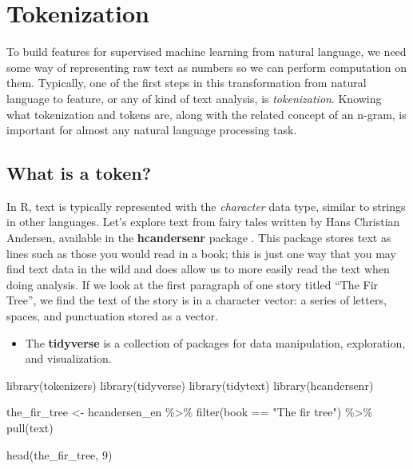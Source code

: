 \documentclass[
]{krantz}
\makeatletter
\newenvironment{Shaded}{\begin{snugshade}}{\end{snugshade}}
\newcommand{\DecValTok}[1]{\textcolor[rgb]{0.00,0.00,0.81}{#1}}
\newcommand{\FunctionTok}[1]{\textcolor[rgb]{0.00,0.00,0.00}{#1}}
\newcommand{\NormalTok}[1]{#1}
\newcommand{\OtherTok}[1]{\textcolor[rgb]{0.56,0.35,0.01}{#1}}
\newcommand{\SpecialCharTok}[1]{\textcolor[rgb]{0.00,0.00,0.00}{#1}}
\newcommand{\StringTok}[1]{\textcolor[rgb]{0.31,0.60,0.02}{#1}}
\newenvironment{kframe}{%
\medskip{}
\setlength{\fboxsep}{.8em}
 \def\at@end@of@kframe{}%
 \ifinner\ifhmode%
  \def\at@end@of@kframe{\end{minipage}}%
  \begin{minipage}{\columnwidth}%
 \fi\fi%
 \def\FrameCommand##1{\hskip\@totalleftmargin \hskip-\fboxsep
 \colorbox{shadecolor}{##1}\hskip-\fboxsep
     \hskip-\linewidth \hskip-\@totalleftmargin \hskip\columnwidth}%
 \MakeFramed {\advance\hsize-\width
   \@totalleftmargin\z@ \linewidth\hsize
   \@setminipage}}%
 {\par\unskip\endMakeFramed%
 \at@end@of@kframe}
\renewenvironment{Shaded}{\begin{kframe}}{\end{kframe}}
\newenvironment{rmdblock}[1]
  {\begin{shaded*}
  \begin{itemize}[left = -1cm, labelsep = 1cm]
  \renewcommand{\labelitemi}{
    \raisebox{-.7\height}[0pt][0pt]{
      {\setkeys{Gin}{width=3em,keepaspectratio}\texttt{[image: images/\#1]}}
    }
  }
 
  \item
  }
  {
  \end{itemize}
  \end{shaded*}
  }
\newenvironment{rmdpackage}
  {\begin{rmdblock}{package}}
  {\end{rmdblock}}
\makeatother
\begin{document}
\hypertarget{tokenization}{%
\chapter{Tokenization}\label{tokenization}}

To build features for supervised machine learning from natural language, we need some way of representing raw text as numbers so we can perform computation on them. Typically, one of the first steps in this transformation from natural language to feature, or any of kind of text analysis, is \emph{tokenization}. Knowing what tokenization and tokens are, along with the related concept of an n-gram, is important for almost any natural language processing task.

\hypertarget{what-is-a-token}{%
\section{What is a token?}\label{what-is-a-token}}

In R, text is typically represented with the \emph{character} data type, similar to strings in other languages. Let's explore text from fairy tales written by Hans Christian Andersen, available in the \textbf{hcandersenr} package \citep{R-hcandersenr}. This package stores text as lines such as those you would read in a book; this is just one way that you may find text data in the wild and does allow us to more easily read the text when doing analysis.
If we look at the first paragraph of one story titled ``The Fir Tree'', we find the text of the story is in a character vector: a series of letters, spaces, and punctuation stored as a vector.

\begin{rmdpackage}
The \textbf{tidyverse} is a collection of packages for data
manipulation, exploration, and visualization.
\end{rmdpackage}

\begin{Shaded}
\begin{Highlighting}[]
\FunctionTok{library}\NormalTok{(tokenizers)}
\FunctionTok{library}\NormalTok{(tidyverse)}
\FunctionTok{library}\NormalTok{(tidytext)}
\FunctionTok{library}\NormalTok{(hcandersenr)}

\NormalTok{the\_fir\_tree }\OtherTok{\textless{}{-}}\NormalTok{ hcandersen\_en }\SpecialCharTok{\%\textgreater{}\%}
  \FunctionTok{filter}\NormalTok{(book }\SpecialCharTok{==} \StringTok{"The fir tree"}\NormalTok{) }\SpecialCharTok{\%\textgreater{}\%}
  \FunctionTok{pull}\NormalTok{(text)}

\FunctionTok{head}\NormalTok{(the\_fir\_tree, }\DecValTok{9}\NormalTok{)}
\end{Highlighting}
\end{Shaded}
\end{document}
